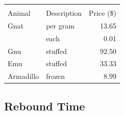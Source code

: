 \begin{tabular}{llr}
{\begin{tabular}{llr}
\toprule
\multicolumn{2}{c}{Item} \\
\cmidrule(r){1-2}
Animal    & Description & Price (\$) \\
\midrule
Gnat      & per gram    & 13.65      \\
          & each        & 0.01       \\
Gnu       & stuffed     & 92.50      \\
Emu       & stuffed     & 33.33      \\
Armadillo & frozen      & 8.99       \\
\bottomrule
\end{tabular}

%
%


\subsection{Rebound Time}





